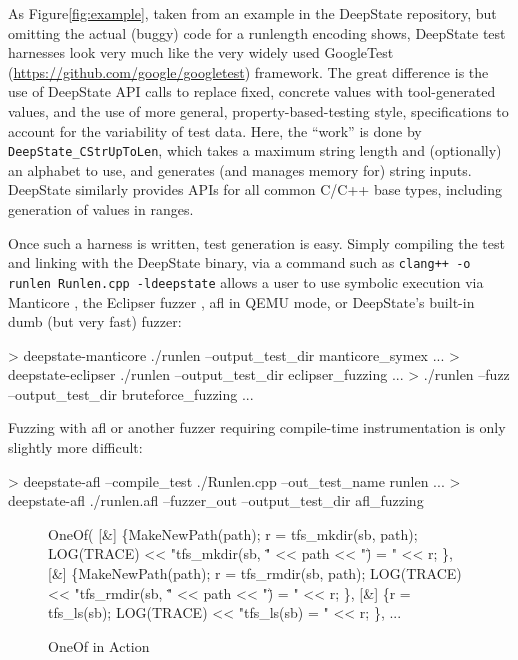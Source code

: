 \documentclass[sigconf]{acmart}
\begin{document}
  As Figure\ref{fig:example}, taken from an example in the DeepState repository, but omitting the actual (buggy) code for a runlength encoding shows, DeepState test harnesses look very much like the very widely used GoogleTest (\url{https://github.com/google/googletest}) framework.  The great difference is the use of DeepState API calls to replace fixed, concrete values with tool-generated values, and the use of more general, property-based-testing style, specifications to account for the variability of test data.  Here, the ``work'' is done by {\tt DeepState\_CStrUpToLen}, which takes a maximum string length and (optionally) an alphabet to use, and generates (and manages memory for) string inputs.  DeepState similarly provides APIs for all common C/C++ base types, including generation of values in ranges.

Once such a harness is written, test generation is easy.  Simply compiling the test and linking with the DeepState binary, via a command such as {\tt clang++ -o runlen Runlen.cpp -ldeepstate} allows a user to use symbolic execution via Manticore \cite{mossberg2019manticore}, the Eclipser fuzzer \cite{choi:icse:2019}, afl in QEMU mode, or DeepState's built-in dumb (but very fast) fuzzer:

  {\scriptsize
\begin{code}
> deepstate-manticore ./runlen --output\_test\_dir manticore\_symex
...
> deepstate-eclipser ./runlen --output\_test\_dir eclipser\_fuzzing
...
> ./runlen --fuzz --output\_test\_dir bruteforce\_fuzzing
...
\end{code}
}

Fuzzing with afl or another fuzzer requiring compile-time instrumentation is only slightly more difficult:

{\scriptsize
\begin{code}
> deepstate-afl --compile\_test ./Runlen.cpp --out\_test\_name runlen
...
> deepstate-afl ./runlen.afl --fuzzer\_out --output\_test\_dir afl\_fuzzing
\end{code}
}

\begin{figure}
{\scriptsize
\begin{code}
    OneOf(
	  [\&] \{MakeNewPath(path);
            r = tfs\_mkdir(sb, path);
            LOG(TRACE) << "tfs\_mkdir(sb, \"" << path << "\") = " << r;
	  \},
	  [\&] \{MakeNewPath(path);
            r = tfs\_rmdir(sb, path);
            LOG(TRACE) << "tfs\_rmdir(sb, \"" << path << "\") = " << r;
	  \},
	  [\&] \{r = tfs\_ls(sb);
            LOG(TRACE) << "tfs\_ls(sb) = " << r;
	  \},
   ...
\end{code}
}
  \caption{OneOf in Action}
  \label{fig:oneof}
  \end{figure}
\end{document}
